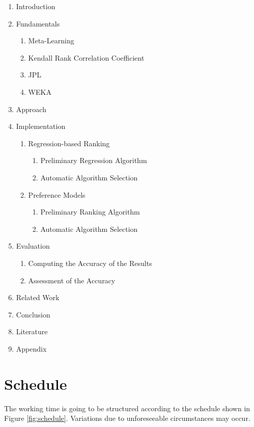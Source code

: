 \documentclass[12pt]{scrartcl}
\begin{document}
\begin{enumerate}
	\item Introduction
	\item Fundamentals
	\begin{enumerate}
		\item Meta-Learning
		\item Kendall Rank Correlation Coefficient
		\item JPL
		\item WEKA
	\end{enumerate}
	\item Approach
	\item Implementation
	\begin{enumerate} 
		\item Regression-based Ranking
		\begin{enumerate}
			\item Preliminary Regression Algorithm
			\item Automatic Algorithm Selection
		\end{enumerate}
		\item Preference Models
		\begin{enumerate}
			\item Preliminary Ranking Algorithm
			\item Automatic Algorithm Selection
		\end{enumerate}
	\end{enumerate}
	\item Evaluation
	\begin{enumerate}
		\item Computing the Accuracy of the Results
		\item Assessment of the Accuracy
	\end{enumerate}
	\item Related Work
	\item Conclusion
	\item Literature
	\item Appendix
\end{enumerate}


\newpage
\section{Schedule}\label{sec:schedule}
The working time is going to be structured according to the schedule shown in Figure \ref{fig:schedule}. Variations due to unforeseeable circumstances may occur.
\end{document}
